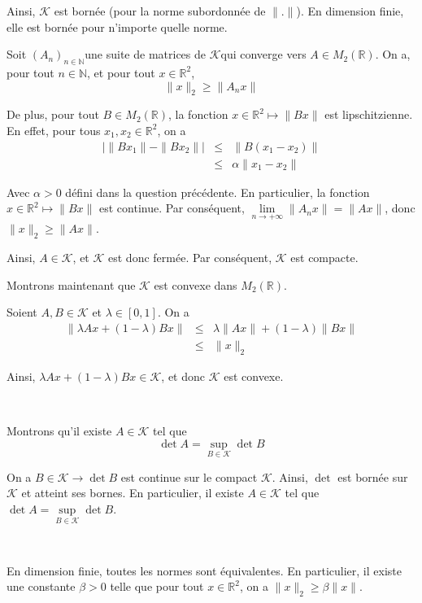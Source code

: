 Ainsi, $\mathcal{K}$ est born{\'e}e (pour la norme subordonn{\'e}e de $\| .
\|$). En dimension finie, elle est born{\'e}e pour n'importe quelle norme.

Soit $(A_n)_{n \in \mathbb{N}} $une suite de matrices de $\mathcal{K}$qui
converge vers $A \in M_2 (\mathbb{R})$. On a, pour tout $n \in \mathbb{N}$, et
pour tout $x \in \mathbb{R}^2$,
\[ \| x \|_2 \geqslant \| A_n x \| \]


De plus, pour tout $B \in M_2 (\mathbb{R})$, la fonction $x \in \mathbb{R}^2
\longmapsto \| B x \|$ est lipschitzienne. En effet, pour tous $x_1, x_2 \in
\mathbb{R}^2$, on a
\begin{eqnarray*}
  | \| B x_1 \| - \| B x_2 \| | & \leqslant & \| B (x_1 - x_2) \|\\
  & \leqslant & \alpha \| x_1 - x_2 \|
\end{eqnarray*}

Avec $\alpha > 0$ d{\'e}fini dans la question pr{\'e}c{\'e}dente. En
particulier, la fonction $x \in \mathbb{R}^2 \longmapsto \| B x \|$ est
continue. Par cons{\'e}quent, $\underset{n \rightarrow + \infty}{\lim} \| A_n
x \| = \| A x \|$, donc $\| x \|_2 \geqslant \| A  x \|$.

Ainsi, $A \in \mathcal{K}$, et $\mathcal{K}$ est donc ferm{\'e}e. Par
cons{\'e}quent, $\mathcal{K}$ est compacte.

Montrons maintenant que $\mathcal{K}$ est convexe dans $M_2 (\mathbb{R})$.

Soient $A, B \in \mathcal{K}$ et $\lambda \in [0, 1]$. On a
\begin{eqnarray*}
  \| \lambda A x + (1 - \lambda) B x \| & \leqslant & \lambda \| A x \| + (1 -
  \lambda) \| B x \|\\
  & \leqslant & \| x \|_2
\end{eqnarray*}


Ainsi, $\lambda A x + (1 - \lambda) B x \in \mathcal{K}$, et donc
$\mathcal{K}$ est convexe.

\

 Montrons qu'il existe $A \in \mathcal{K}$ tel que
\[ \det A = \underset{B \in \mathcal{K}}{\sup} \det B \]


On a $B \in \mathcal{K} \rightarrow \det B$ est continue sur le compact
$\mathcal{K}$. Ainsi, $\det$ est born{\'e}e sur $\mathcal{K}$ et atteint ses
bornes. En particulier, il existe $A \in \mathcal{K}$ tel que $\det A =
\underset{B \in \mathcal{K}}{\sup} \det B$.

\

 En dimension finie, toutes les normes sont {\'e}quivalentes.
En particulier, il existe une constante $\beta > 0$ telle que pour tout $x \in
\mathbb{R}^2$, on a $\| x \|_2 \geqslant \beta \| x \|$.

